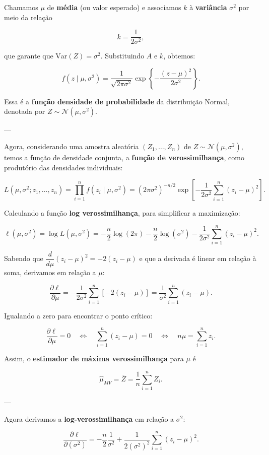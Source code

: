 Chamamos $\mu$ de \textbf{média} (ou valor esperado) e associamos $k$ à \textbf{variância} $\sigma^2$ por meio da relação

\[
k = \frac{1}{2\sigma^2},
\]

que garante que $\mathrm{Var}(Z)=\sigma^2$. Substituindo $A$ e $k$, obtemos:

\[
\boxed{
f(z\mid\mu,\sigma^2)
= \frac{1}{\sqrt{2\pi\sigma^2}}
\exp\!\left\{-\frac{(z-\mu)^2}{2\sigma^2}\right\}.
}
\]

Essa é a \textbf{função densidade de probabilidade} da distribuição Normal, denotada por $Z \sim \mathcal N(\mu,\sigma^2)$.

---

Agora, considerando uma amostra aleatória \( (Z_1, \dots, Z_n) \) de \( Z \sim \mathcal N(\mu,\sigma^2) \), temos a função de densidade conjunta, a \textbf{função de verossimilhança}, como produtório das densidades individuais:

\[
L(\mu,\sigma^2; z_1, \dots, z_n)
= \prod_{i=1}^n f(z_i\mid\mu,\sigma^2)
= (2\pi\sigma^2)^{-n/2}
\exp\!\left[-\frac{1}{2\sigma^2}\sum_{i=1}^n (z_i - \mu)^2\right].
\]

Calculando a função \textbf{log verossimilhança}, para simplificar a maximização:

\[
\ell(\mu,\sigma^2)
= \log L(\mu,\sigma^2)
= -\frac{n}{2}\log(2\pi)
- \frac{n}{2}\log(\sigma^2)
- \frac{1}{2\sigma^2}\sum_{i=1}^n (z_i-\mu)^2.
\]

Sabendo que 
\(\dfrac{d}{d\mu}(z_i-\mu)^2 = -2(z_i-\mu)\)
e que a derivada é linear em relação à soma, derivamos em relação a \textbf{$\mu$}:

\[
\frac{\partial \ell}{\partial \mu}
= -\frac{1}{2\sigma^2}\sum_{i=1}^n [-2(z_i-\mu)]
= \frac{1}{\sigma^2}\sum_{i=1}^n (z_i-\mu).
\]

Igualando a zero para encontrar o ponto crítico:

\[
\frac{\partial \ell}{\partial \mu}=0
\quad\Longleftrightarrow\quad
\sum_{i=1}^n (z_i-\mu)=0
\quad\Longleftrightarrow\quad
n\mu=\sum_{i=1}^n z_i.
\]

Assim, o \textbf{estimador de máxima verossimilhança} para $\mu$ é

\[
\boxed{
\widehat\mu_{MV} = \bar{Z} = \frac{1}{n}\sum_{i=1}^n Z_i.
}
\]

---

Agora derivamos a \textbf{log-verossimilhança} em relação a \textbf{$\sigma^2$}:

\[
\frac{\partial \ell}{\partial(\sigma^2)}
= -\frac{n}{2}\frac{1}{\sigma^2}
+ \frac{1}{2(\sigma^2)^2}\sum_{i=1}^n (z_i-\mu)^2.
\]

